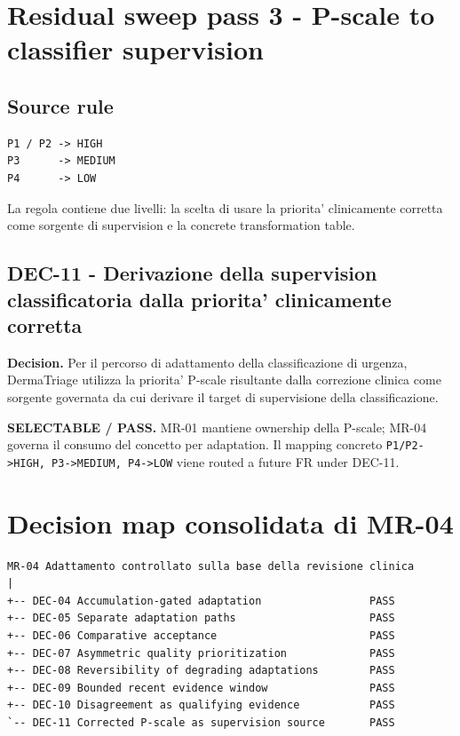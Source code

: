 \documentclass[11pt,a4paper]{article}
\begin{document}
\section{Residual sweep pass 3 - P-scale to classifier supervision}
\subsection{Source rule}
\begin{lstlisting}
P1 / P2 -> HIGH
P3      -> MEDIUM
P4      -> LOW
\end{lstlisting}

La regola contiene due livelli: la scelta di usare la priorita' clinicamente corretta come sorgente di supervision e la concrete transformation table.

\subsection{DEC-11 - Derivazione della supervision classificatoria dalla priorita' clinicamente corretta}
\textbf{Decision.} Per il percorso di adattamento della classificazione di urgenza, DermaTriage utilizza la priorita' P-scale risultante dalla correzione clinica come sorgente governata da cui derivare il target di supervisione della classificazione.

\begin{ddtacore}[title={Disposition}]
\textbf{SELECTABLE / PASS.} MR-01 mantiene ownership della P-scale; MR-04 governa il consumo del concetto per adaptation. Il mapping concreto \texttt{P1/P2->HIGH, P3->MEDIUM, P4->LOW} viene routed a future FR under DEC-11.
\end{ddtacore}

\section{Decision map consolidata di MR-04}
\begin{lstlisting}
MR-04 Adattamento controllato sulla base della revisione clinica
|
+-- DEC-04 Accumulation-gated adaptation                 PASS
+-- DEC-05 Separate adaptation paths                     PASS
+-- DEC-06 Comparative acceptance                        PASS
+-- DEC-07 Asymmetric quality prioritization             PASS
+-- DEC-08 Reversibility of degrading adaptations        PASS
+-- DEC-09 Bounded recent evidence window                PASS
+-- DEC-10 Disagreement as qualifying evidence           PASS
`-- DEC-11 Corrected P-scale as supervision source       PASS
\end{lstlisting}
\end{document}
